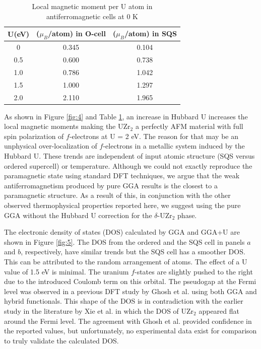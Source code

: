 \documentclass[preprint,12pt]{elsarticle}
\begin{document}
\begin{table}[h!]
    \centering
    \caption{Local magnetic moment per U atom in antiferromagnetic cells at 0 K}
    \label{tab:mag_AFM_0K}
    \begin{tabular}{|c|c|c| }
    \hline
U(eV) & ($\mu_B$/atom) in O-cell & ($\mu_B$/atom) in SQS   \\
 \hline
      0     &   0.345   &  0.104 \\
 0.5        &       0.600   &    0.738      \\
  1.0 &   0.786      &   1.042 \\
    1.5 & 1.000      &   1.297 \\
    2.0  &      2.110            &      1.965         \\
     \hline
    \end{tabular}
\end{table}

As shown in Figure \ref{fig:4} and Table \ref{tab:mag_AFM_0K}, an increase in Hubbard U increases the local magnetic moments making the UZr$_2$ a perfectly AFM material with full spin polarization of $f$-electrons at U = 2 eV. The reason for that may be an unphysical over-localization of $f$-electrons in a metallic system induced by the Hubbard U. These trends are independent of input atomic structure (SQS versus ordered supercell) or temperature. Although we could not exactly reproduce the paramagnetic state using standard DFT techniques, we argue that the weak antiferromagnetism produced by pure GGA results is the closest to a paramagnetic structure. As a result of this, in conjunction with the other observed thermophysical properties reported here, we suggest using the pure GGA without the Hubbard U correction for the $\delta$-UZr$_2$ phase. 

The electronic density of states (DOS) calculated by GGA and GGA+U are shown in Figure \ref{fig:5}. The DOS from the ordered and the SQS cell in panels $a$ and $b$, respectively, have similar trends but the SQS cell has a smoother DOS. This can be attributed to the random arrangement of atoms. The effect of a U value of 1.5 eV is minimal. The uranium $f$-states are slightly pushed to the right due to the introduced Coulomb term on this orbital. The pseudogap at the Fermi level was observed in a previous DFT study by Ghosh et al. \cite{ghosh_chemical_2021} using both GGA and hybrid functionals. This shape of the DOS is in contradiction with the earlier study in the literature by Xie et al. \cite{xie_correlation_2013} in which the DOS of UZr$_2$ appeared flat around the Fermi level. The agreement with Ghosh et al. provided confidence in the reported values, but unfortunately, no experimental data exist for comparison to truly validate the calculated DOS. 
\end{document}
